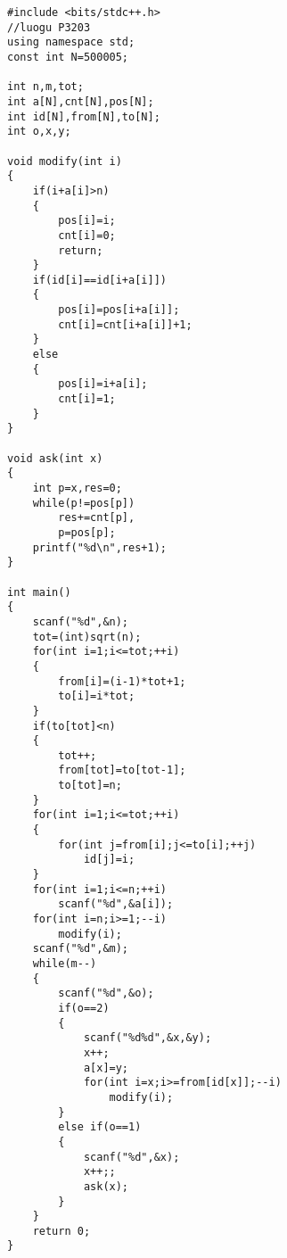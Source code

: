 \begin{lstlisting}
#include <bits/stdc++.h>
//luogu P3203
using namespace std;
const int N=500005;

int n,m,tot;
int a[N],cnt[N],pos[N];
int id[N],from[N],to[N];
int o,x,y;

void modify(int i)
{
	if(i+a[i]>n)
	{
		pos[i]=i;
		cnt[i]=0;
		return;
	}
	if(id[i]==id[i+a[i]])
	{
		pos[i]=pos[i+a[i]];
		cnt[i]=cnt[i+a[i]]+1;
	}
	else
	{
		pos[i]=i+a[i];
		cnt[i]=1;
	}
}

void ask(int x)
{
	int p=x,res=0;
	while(p!=pos[p])
		res+=cnt[p],
		p=pos[p];
	printf("%d\n",res+1);
}

int main()
{
	scanf("%d",&n);
	tot=(int)sqrt(n);
	for(int i=1;i<=tot;++i)
	{
		from[i]=(i-1)*tot+1;
		to[i]=i*tot;
	}
	if(to[tot]<n)
	{
		tot++;
		from[tot]=to[tot-1];
		to[tot]=n;
	}
	for(int i=1;i<=tot;++i)
	{
		for(int j=from[i];j<=to[i];++j)
			id[j]=i;
	}
	for(int i=1;i<=n;++i)
		scanf("%d",&a[i]);
	for(int i=n;i>=1;--i)
		modify(i);
	scanf("%d",&m);
	while(m--)
	{
		scanf("%d",&o);
		if(o==2)
		{
			scanf("%d%d",&x,&y);
			x++;
			a[x]=y;
			for(int i=x;i>=from[id[x]];--i)
				modify(i);
		}
		else if(o==1)
		{
			scanf("%d",&x);
			x++;;
			ask(x);
		}
	}
	return 0;
}
\end{lstlisting}